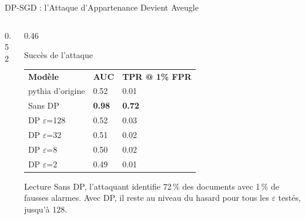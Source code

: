\begin{frame}{DP-SGD : l'Attaque d'Appartenance Devient Aveugle}
    \begin{columns}[T]
        \begin{column}{0.52\textwidth}
        \end{column}
        \begin{column}{0.46\textwidth}
            \begin{block}{Succès de l'attaque}
                \renewcommand{\arraystretch}{1.0}
                {\scriptsize
                \begin{tabularx}{\textwidth}{l X X}
                    \rowcolor{TSPblue}\color{white}\textbf{Modèle} & \color{white}\textbf{AUC} & \color{white}\textbf{TPR @ 1\% FPR} \\
                    pythia d'origine & 0.52 & 0.01 \\
                    \rowcolor{TSPgrey} Sans DP & \textbf{0.98} & \textbf{0.72} \\
                    DP $\varepsilon$=128 & 0.52 & 0.03 \\
                    \rowcolor{TSPgrey} DP $\varepsilon$=32 & 0.51 & 0.02 \\
                    DP $\varepsilon$=8 & 0.50 & 0.02 \\
                    \rowcolor{TSPgrey} DP $\varepsilon$=2 & 0.49 & 0.01 \\
                \end{tabularx}
                }
            \end{block}
            \begin{alertblock}{Lecture}
                \scriptsize Sans DP, l'attaquant identifie 72\,\% des documents avec 1\,\% de fausses alarmes. Avec DP, il reste au niveau du hasard pour tous les $\varepsilon$ testés, jusqu'à 128.
            \end{alertblock}
        \end{column}
    \end{columns}
\end{frame}

